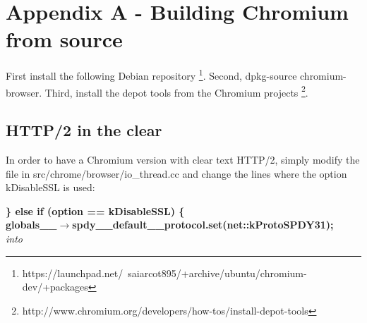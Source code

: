 \documentclass[12pt, notitlepage]{article}
\begin{document}
\clearpage
\section{Appendix A - Building Chromium from source}

First install the following Debian repository
\footnote{https://launchpad.net/~saiarcot895/+archive/ubuntu/chromium-dev/+packages}.
Second, dpkg-source chromium-browser.
Third, install the depot tools from the Chromium projects
\footnote{http://www.chromium.org/developers/how-tos/install-depot-tools}.

\subsection{HTTP/2 in the clear}
In order to have a Chromium version with clear text HTTP/2, simply
modify the file in src/chrome/browser/io\_thread.cc and change the lines where
the option kDisableSSL is used:

\textbf{\} else if (option == kDisableSSL) \{}\\
\hspace*{1cm}\textbf{globals\_\_$\rightarrow$spdy\_\_default\_\_protocol.set(net::kProtoSPDY31);}\\

\textit{into}\\
\end{document}
